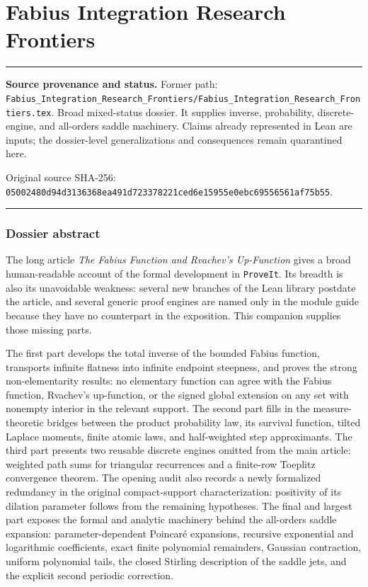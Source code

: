 \documentclass[11pt,oneside]{article}
\theoremstyle{definition}
\theoremstyle{remark}
\newenvironment{boxedremark}{%
  \par\smallskip\noindent\begin{center}\begin{minipage}{0.94\textwidth}%
  \color{black}\hrule\vspace{0.6em}\small
}{%
  \vspace{0.6em}\hrule\end{minipage}\end{center}\smallskip
}
\begin{document}
\clearpage
\part{Fabius Integration Research Frontiers}
\label{part:integration}
\begin{boxedremark}
\textbf{Source provenance and status.} Former path: \nolinkurl{Fabius_Integration_Research_Frontiers/Fabius_Integration_Research_Frontiers.tex}.  Broad mixed-status dossier.  It supplies inverse, probability, discrete-engine, and all-orders saddle machinery.  Claims already represented in Lean are inputs; the dossier-level generalizations and consequences remain quarantined here.\par\smallskip Original source SHA-256: \nolinkurl{05002480d94d3136368ea491d723378221ced6e15955e0ebc69556561af75b55}.
\end{boxedremark}
\section*{Dossier abstract}
The long article \emph{The Fabius Function and Rvachev's Up-Function} gives a broad
human-readable account of the formal development in \texttt{ProveIt}.  Its breadth is also
its unavoidable weakness: several new branches of the Lean library postdate the article,
and several generic proof engines are named only in the module guide because they have no
counterpart in the exposition.  This companion supplies those missing parts.

The first part develops the total inverse of the bounded Fabius function, transports
infinite flatness into infinite endpoint steepness, and proves the strong non-elementarity
results: no elementary function can agree with the Fabius function, Rvachev's up-function,
or the signed global extension on any set with nonempty interior in the relevant support.
The second part fills in the measure-theoretic bridges between the product probability law,
its survival function, tilted Laplace moments, finite atomic laws, and half-weighted step
approximants.  The third part presents two reusable discrete engines omitted from the main
article: weighted path sums for triangular recurrences and a finite-row Toeplitz convergence
theorem.  The opening audit also records a newly formalized redundancy in the original
compact-support characterization: positivity of its dilation parameter follows from the
remaining hypotheses.  The final and largest part exposes the formal and analytic machinery behind the
all-orders saddle expansion: parameter-dependent Poincar\'e expansions, recursive
exponential and logarithmic coefficients, exact finite polynomial remainders, Gaussian
contraction, uniform polynomial tails, the closed Stirling description of the saddle jets,
and the explicit second periodic correction.
\end{document}
